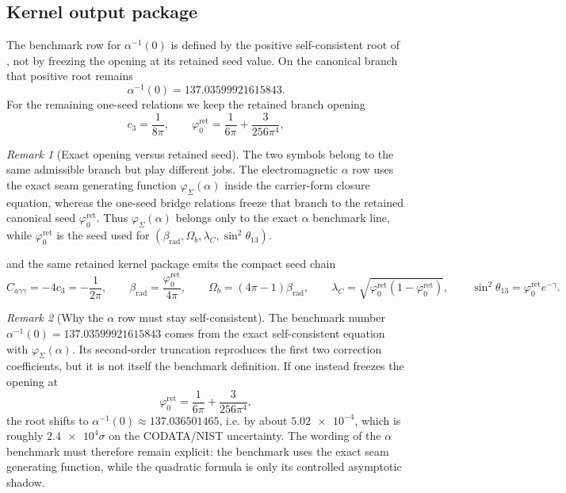 \documentclass[11pt,a4paper]{article}
\theoremstyle{definition}
\theoremstyle{remark}
\newtheorem*{remark}{Remark}
\newcommand{\cthree}{c_3}
\newcommand{\phiz}{\varphi_0^{\mathrm{ret}}}
\newcommand{\phiseam}{\varphi_{\Sigma}}
\begin{document}
\subsection{Kernel output package}

The benchmark row for $\alpha^{-1}(0)$ is defined by the positive self-consistent root of , not by freezing the opening at its retained seed value. On the canonical branch that positive root remains
\[
\alpha^{-1}(0)=\num{137.03599921615843}.
\]
For the remaining one-seed relations we keep the retained branch opening
\begin{equation}
\label{eq:hard-kernel-values}
\cthree=\frac{1}{8\pi},
\qquad
\phiz=\frac{1}{6\pi}+\frac{3}{256\pi^4},
\end{equation}
\begin{remark}[Exact opening versus retained seed]
The two symbols belong to the same admissible branch but play different jobs. The electromagnetic $\alpha$ row uses the exact seam generating function $\phiseam(\alpha)$ inside the carrier-form closure equation, whereas the one-seed bridge relations freeze that branch to the retained canonical seed $\phiz$. Thus $\phiseam(\alpha)$ belongs only to the exact $\alpha$ benchmark line, while $\phiz$ is the seed used for $(\beta_{\mathrm{rad}},\Omega_b,\lambda_C,\sin^2\theta_{13})$.
\end{remark}
and the same retained kernel package emits the compact seed chain
\begin{equation}
\label{eq:kernel-benchmark-formulas}
C_{a\gamma\gamma}=-4\cthree=-\frac{1}{2\pi},
\qquad
\beta_{\mathrm{rad}}=\frac{\phiz}{4\pi},
\qquad
\Omega_b=(4\pi-1)\beta_{\mathrm{rad}},
\qquad
\lambda_C=\sqrt{\phiz(1-\phiz)},
\qquad
\sin^2\theta_{13}=\phiz e^{-\gamma}.
\end{equation}
\begin{remark}[Why the $\alpha$ row must stay self-consistent]
The benchmark number $\alpha^{-1}(0)=\num{137.03599921615843}$ comes from the exact self-consistent equation with $\phiseam(\alpha)$. Its second-order truncation reproduces the first two correction coefficients, but it is not itself the benchmark definition. If one instead freezes the opening at
\[
\phiz=\frac{1}{6\pi}+\frac{3}{256\pi^4},
\]
the root shifts to $\alpha^{-1}(0)\approx \num{137.036501465}$, i.e. by about $\num{5.02e-4}$, which is roughly $\num{2.4e4}\sigma$ on the CODATA/NIST uncertainty. The wording of the $\alpha$ benchmark must therefore remain explicit: the benchmark uses the exact seam generating function, while the quadratic formula is only its controlled asymptotic shadow.
\end{remark}
\end{document}

